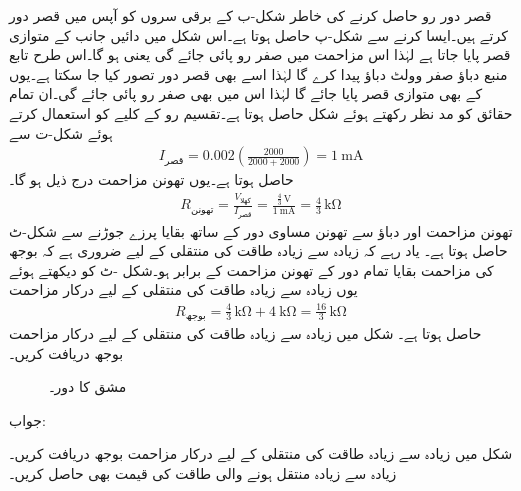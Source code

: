 قصر دور رو حاصل کرنے کی خاطر شکل-ب کے برقی سروں کو آپس میں قصر دور کرتے ہیں۔ایسا کرنے سے شکل-پ حاصل ہوتا ہے۔اس شکل میں دائیں جانب  کے متوازی قصر پایا جاتا ہے لہٰذا اس مزاحمت میں صفر رو پائی جائے گی  یعنی ہو گا۔اس طرح تابع منبع دباؤ صفر وولٹ دباؤ پیدا کرے گا لہٰذا اسے  بھی قصر دور  تصور کیا جا سکتا ہے۔یوں  کے بھی متوازی قصر پایا جائے گا لہٰذا اس میں بھی صفر رو پائی جائے گی۔ان تمام حقائق کو مد نظر رکھتے ہوئے شکل حاصل ہوتا ہے۔تقسیم رو کے کلیے کو استعمال کرتے ہوئے شکل-ت سے
\begin{align*}
I_{\text{قصر}} = 0.002\left(\frac{2000}{2000+2000}\right)=\SI{1}{\milli\ampere}
\end{align*}
حاصل ہوتا ہے۔یوں تھونن مزاحمت درج ذیل ہو گا۔
\begin{align*}
R_{\text{تھونن}}=\frac{V_{\text{کھلا}}}{I_{\text{قصر}}}=\frac{\frac{4}{3} \, \si{\volt}}{\SI{1}{\milli\ampere}}=\frac{4}{3}\, \si{\kilo\ohm}
\end{align*}
تھونن مزاحمت اور دباؤ سے تھونن مساوی دور کے ساتھ بقایا پرزے جوڑنے سے شکل-ٹ حاصل ہوتا ہے۔ یاد رہے کہ زیادہ سے زیادہ طاقت کی منتقلی کے لیے ضروری ہے کہ بوجھ کی مزاحمت بقایا تمام دور کے تھونن مزاحمت کے برابر ہو۔شکل -ٹ کو دیکھتے ہوئے یوں زیادہ سے زیادہ طاقت کی منتقلی کے لیے درکار مزاحمت
\begin{align*}
R_{\text{بوجھ}}=\frac{4}{3} \, \si{\kilo\ohm}+\SI{4}{\kilo\ohm}=\frac{16}{3}\, \si{\kilo\ohm}
\end{align*}
حاصل ہوتا ہے۔
شکل  میں زیادہ سے زیادہ طاقت کی منتقلی کے لیے درکار مزاحمت بوجھ دریافت کریں۔

\begin{figure}
\centering
{}
\caption{مشق  کا دور۔}
\label{شکل_مسئلہ_مشق_منتقلی_طاقت_الف}
\end{figure}

جواب:

شکل  میں زیادہ سے زیادہ طاقت کی منتقلی کے لیے درکار مزاحمت بوجھ دریافت کریں۔زیادہ سے زیادہ منتقل ہونے والی طاقت کی قیمت بھی حاصل کریں۔

